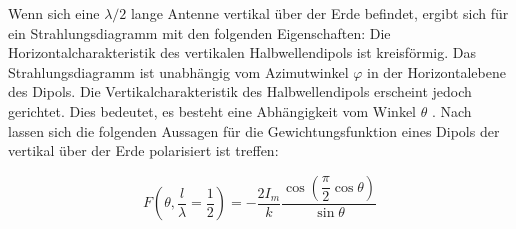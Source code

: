 Wenn sich eine $\lambda /2$ lange Antenne vertikal über der Erde befindet,  ergibt sich für ein Strahlungsdiagramm mit den folgenden Eigenschaften: 
Die Horizontalcharakteristik des vertikalen Halbwellendipols ist kreisförmig. Das Strahlungsdiagramm ist unabhängig vom Azimutwinkel $\varphi$ in der Horizontalebene des Dipols. Die Vertikalcharakteristik des  Halbwellendipols erscheint jedoch gerichtet. Dies bedeutet, es besteht eine Abhängigkeit vom Winkel $\theta$ \cite{zinke1965lehrbuch}. 
Nach \cite{elliott1981antenna} lassen sich die folgenden Aussagen für die Gewichtungsfunktion  eines Dipols der vertikal über der Erde polarisiert ist treffen\cite{elliott1981antenna}:

\begin{equation}\label{eq:FDipolTheat}
F(\theta,\frac{l}{\lambda}=\dfrac{1}{2})=-\dfrac{2I_{m}}{k}\dfrac{\cos\left(\dfrac{\pi}{2}\cos\theta\right)}{\sin\theta}
\end{equation}


